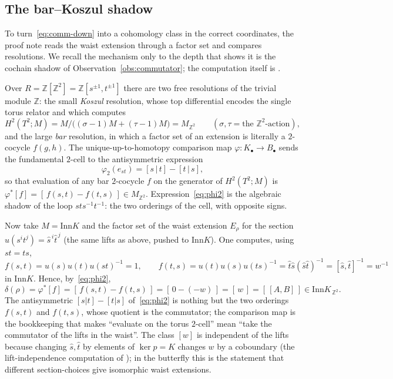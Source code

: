 \documentclass[11pt]{article}
\theoremstyle{definition}
\newcommand{\Z}{\mathbb{Z}}
\newcommand{\Inn}{\mathrm{Inn}}
\begin{document}
\subsection{The bar--Koszul shadow}

To turn~\eqref{eq:comm-down} into a cohomology class in the correct coordinates, the proof note
reads the waist extension through a factor set and compares resolutions. We recall the mechanism
only to the depth that shows it is the cochain shadow of Observation~\ref{obs:commutator}; the
computation itself is \cite[\S3]{capstone}.

Over $R=\Z[\Z^2]=\Z[s^{\pm1},t^{\pm1}]$ there are two free resolutions of the trivial module $\Z$:
the small \emph{Koszul} resolution, whose top differential encodes the single torus relator and
which computes
\[
H^2(T^2;M)=M\big/\big((\sigma-1)M+(\tau-1)M\big)=M_{\Z^2}\qquad(\sigma,\tau=\text{the }\Z^2\text{-action}),
\]
and the large \emph{bar} resolution, in which a factor set of an extension is literally a
$2$-cocycle $f(g,h)$. The unique-up-to-homotopy comparison map $\varphi\colon K_\bullet\to B_\bullet$
sends the fundamental $2$-cell to the antisymmetric expression
\begin{equation}\label{eq:phi2}
\varphi_2(e_{st})=[s\,|\,t]-[t\,|\,s],
\end{equation}
so that evaluation of any bar $2$-cocycle $f$ on the generator of $H^2(T^2;M)$ is
$\varphi^*[f]=[\,f(s,t)-f(t,s)\,]\in M_{\Z^2}$. Expression~\eqref{eq:phi2} is the algebraic shadow
of the loop $sts^{-1}t^{-1}$: the two orderings of the cell, with opposite signs.

Now take $M=\Inn K$ and the factor set of the waist extension $E_\rho$ for the section
$u(s^it^j)=\hat s^{\,i}\hat t^{\,j}$ (the same lifts as above, pushed to $\Inn K$). One computes,
using $st=ts$,
\[
f(s,t)=u(s)u(t)u(st)^{-1}=1,\qquad
f(t,s)=u(t)u(s)u(ts)^{-1}=\hat t\hat s(\hat s\hat t)^{-1}=[\hat s,\hat t]^{-1}=w^{-1}
\]
in $\Inn K$. Hence, by~\eqref{eq:phi2},
\begin{equation}\label{eq:delta-value}
\delta(\rho)=\varphi^*[f]=[\,f(s,t)-f(t,s)\,]=[\,0-(-w)\,]=[\,w\,]=[\,[A,B]\,]\in \Inn K_{\,\Z^2}.
\end{equation}
The antisymmetric $[s|t]-[t|s]$ of~\eqref{eq:phi2} is nothing but the two orderings $f(s,t)$ and
$f(t,s)$, whose quotient is the commutator; the comparison map is the bookkeeping that makes
``evaluate on the torus $2$-cell'' mean ``take the commutator of the lifts in the waist''. The
class $[w]$ is independent of the lifts because changing $\hat s,\hat t$ by elements of
$\ker p=K$ changes $w$ by a coboundary (the lift-independence computation of \cite{capstone}); in
the butterfly this is the statement that different section-choices give isomorphic waist extensions.
\end{document}
